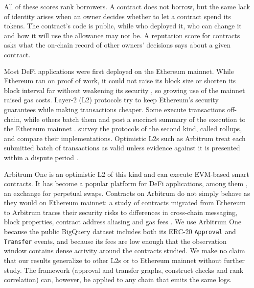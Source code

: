All of these scores rank borrowers. A contract does not borrow, but the same lack of identity arises when an owner decides whether to let a contract spend its tokens. The contract's code is public, while who deployed it, who can change it and how it will use the allowance may not be. A reputation score for contracts asks what the on-chain record of other owners' decisions says about a given contract.


Most DeFi applications were first deployed on the Ethereum mainnet. While Ethereum ran on proof of work, it could not raise its block size or shorten its block interval far without weakening its security \parencite{gervais2016pow}, so growing use of the mainnet raised gas costs. Layer-2 (L2) protocols try to keep Ethereum's security guarantees while making transactions cheaper. Some execute transactions off-chain, while others batch them and post a succinct summary of the execution to the Ethereum mainnet \parencite{gudgeon2020layertwo}. \textcite{thibault2022rollups} survey the protocols of the second kind, called rollups, and compare their implementations. Optimistic L2s such as Arbitrum treat each submitted batch of transactions as valid unless evidence against it is presented within a dispute period \parencite{kalodner2018arbitrum}.

Arbitrum One is an optimistic L2 of this kind and can execute EVM-based smart contracts. It has become a popular platform for DeFi applications, among them \textcite{gmxnddocs}, an exchange for perpetual swaps. Contracts on Arbitrum do not simply behave as they would on Ethereum mainnet: a study of contracts migrated from Ethereum to Arbitrum traces their security risks to differences in cross-chain messaging, block properties, contract address aliasing and gas fees \parencite{tang2024arbitrum}. We use Arbitrum One because the public BigQuery dataset includes both its ERC-20 \texttt{Approval} and \texttt{Transfer} events, and because its fees are low enough that the observation window contains dense activity around the contracts studied. We make no claim that our results generalize to other L2s or to Ethereum mainnet without further study. The framework (approval and transfer graphs, construct checks and rank correlation) can, however, be applied to any chain that emits the same logs.


